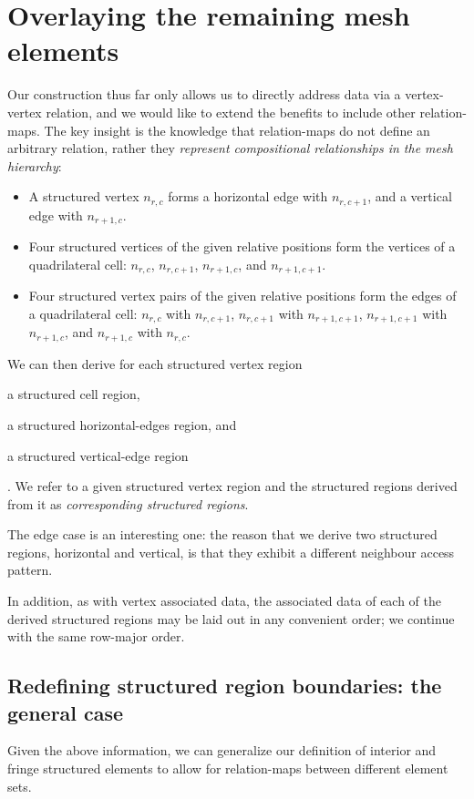 \section{Overlaying the remaining mesh elements}
Our construction thus far only allows us to directly address data via a vertex-vertex relation, and we would like to extend the benefits to include other relation-maps. The key insight is the knowledge that relation-maps do not define an arbitrary relation, rather they \emph{represent compositional relationships in the mesh hierarchy}:
\begin{itemize}
\item A structured vertex $n_{r,c}$ forms a horizontal edge with $n_{r,c+1}$, and a vertical edge with $n_{r+1,c}$.
\item Four structured vertices of the given relative positions form the vertices of a quadrilateral cell: $n_{r,c}$, $n_{r,c+1}$, $n_{r+1,c}$, and $n_{r+1,c+1}$.
\item Four structured vertex pairs of the given relative positions form the edges of a quadrilateral cell: $n_{r,c}$ with $n_{r,c+1}$, $n_{r,c+1}$ with $n_{r+1,c+1}$, $n_{r+1,c+1}$ with $n_{r+1,c}$, and $n_{r+1,c}$ with $n_{r,c}$.
\end{itemize}


We can then derive for each structured vertex region
\begin{enumerate*}[label=\alph*)]
\item a structured cell region,
\item a structured horizontal-edges region, and
\item a structured vertical-edge region
\end{enumerate*}.
We refer to a given structured vertex region and the structured regions derived from it as \emph{corresponding structured regions}.

The edge case is an interesting one: the reason that we derive two structured regions, horizontal and vertical, is that they exhibit a different neighbour access pattern.


In addition, as with vertex associated data, the associated data of each of the derived structured regions may be laid out in any convenient order; we continue with the same row-major order.

\subsection{Redefining structured region boundaries: the general case}
\label{subsec:generalise-boundaries}
Given the above information, we can generalize our definition of interior and fringe structured elements to allow for relation-maps between different element sets.


